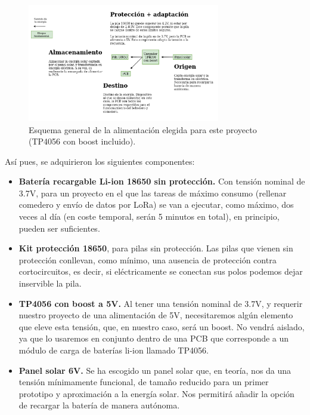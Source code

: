 \documentclass[12pt]{article}
\begin{document}
	\begin{figure}[h!]
		\begin{center}
			\includegraphics[width=0.75\textwidth]{img/conexiones tfg-alimentacion (boost en tp).png}
			\caption{Esquema general de la alimentación elegida para este proyecto (TP4056 con boost incluido).}
			\label{Alimentación: esquema general (tp con boost)}
		\end{center}
	\end{figure}
	
	\pagebreak
	
	\noindent Así pues,  se adquirieron los siguientes componentes: 
	
	\begin{itemize}
		\item \textbf{Batería recargable Li-ion 18650 sin protección.} Con tensión nominal de 3.7V, para un proyecto en el que las tareas de máximo consumo (rellenar comedero y envío de datos por LoRa) se van a ejecutar, como máximo, dos veces al día (en coste temporal, serán 5 minutos en total), en principio, pueden ser suficientes.
		\item \textbf{Kit protección 18650}, para pilas sin protección. Las pilas que vienen sin protección conllevan, como mínimo, una ausencia de protección contra cortocircuitos, es decir, si eléctricamente se conectan sus polos podemos dejar inservible la pila.
		\item \textbf{TP4056 con boost a 5V.} Al tener una tensión nominal de 3.7V, y requerir nuestro proyecto de una alimentación de 5V, necesitaremos algún elemento que eleve esta tensión, que, en nuestro caso, será un boost. No vendrá aislado, ya que lo usaremos en conjunto dentro de una PCB que corresponde a un módulo de carga de baterías li-ion llamado TP4056.
		\item \textbf{Panel solar 6V.} Se ha escogido un panel solar que, en teoría, nos da una tensión mínimamente funcional, de tamaño reducido para un primer prototipo y aproximación a la energía solar. Nos permitirá añadir la opción de recargar la batería de manera autónoma.
	\end{itemize}
\end{document}
